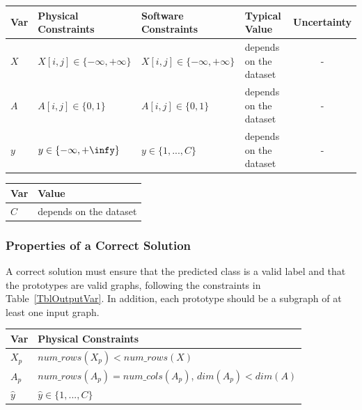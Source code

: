 \documentclass[12pt]{article}
\begin{document}
\begin{table}[!h]
  \caption{Input Variables} \label{TblInputVar}
  \renewcommand{\arraystretch}{1.2}
\noindent \begin{longtable*}{l l l l c} 
  \toprule
  \textbf{Var} & \textbf{Physical Constraints} & \textbf{Software Constraints} &
                             \textbf{Typical Value} & \textbf{Uncertainty}\\
  \midrule 
  $X$ & $X[i,j] \in \{-\infty, +\infty\}$ & $X[i,j] \in \{-\infty, +\infty\}$ & depends on the dataset & - \\
  $A$ & $A[i,j] \in \{0, 1\}$ & $A[i,j] \in \{0, 1\}$ & depends on the dataset & - \\
  $y$ & $y \in \{-\infty, +\infy\}$ & $y \in \{1, ..., C\}$ & depends on the dataset & - \\

  \bottomrule
\end{longtable*}
\end{table}


\begin{table}[!h]
\caption{Specification Parameter Values} \label{TblSpecParams}
\renewcommand{\arraystretch}{1.2}
\noindent \begin{longtable*}{l l} 
  \toprule
  \textbf{Var} & \textbf{Value} \\
  \midrule 
  $C$ & depends on the dataset\\
  \bottomrule
\end{longtable*}
\end{table}

\subsubsection{Properties of a Correct Solution} \label{sec_CorrectSolution}

\noindent
A correct solution must ensure that the predicted class is a valid label and that the prototypes are valid graphs, following the constraints in Table~\ref{TblOutputVar}. In addition, each prototype should be a subgraph of at least one input graph.


\begin{table}[!h]
\caption{Output Variables} \label{TblOutputVar}
\renewcommand{\arraystretch}{1.2}
\noindent \begin{longtable*}{l l} 
  \toprule
  \textbf{Var} & \textbf{Physical Constraints} \\
  \midrule 
  $X_p$ & $num\_rows(X_p) < num\_rows(X)$ \\
  $A_p$ & $num\_rows(A_p) = num\_cols(A_p)$, $dim(A_p) < dim(A)$\\
  $\hat{y}$ & $\hat{y} \in \{1,...,C\}$ 
  \\
  \bottomrule
\end{longtable*}
\end{table}
\end{document}
